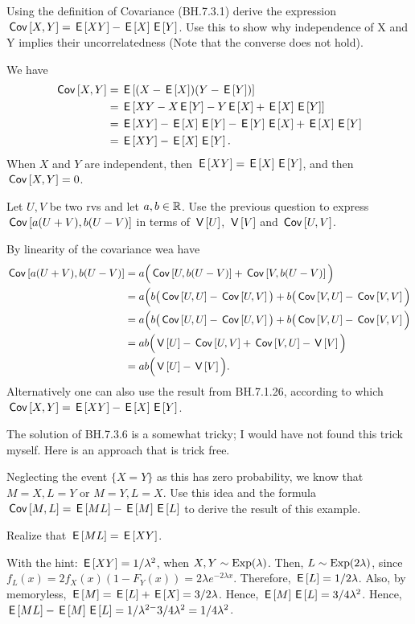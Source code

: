 \begin{exercise}
Using the definition of Covariance (BH.7.3.1) derive the expression $\cov{X,Y}=\E{XY}-\E{X}\E{Y}$. Use this to show why independence of X and Y implies their uncorrelatedness (Note that the converse does not hold).
\begin{solution}
We have
\begin{align}
    \cov{X,Y} &= \E{(X - \E{X})(Y - \E{Y})} \\
    &= \E{XY - X\E{Y} - Y\E{X} + \E{X}\E{Y}} \\
    &= \E{XY} - \E{X}\E{Y} - \E{Y} \E{X} + \E{X}\E{Y}\\
    &= \E{XY}-\E{X}\E{Y}.
\end{align}
When $X$ and $Y$ are independent, then $\E{XY} = \E X \E Y$, and then $\cov{X,Y}=0$.
\end{solution}
\end{exercise}

\begin{exercise}
Let $U, V$ be two rvs and let $a,b\in \R$.
Use the previous question to express $\cov{a(U+V), b(U-V)}$ in terms of $\V{U}$, $\V{V}$ and $\cov{U,V}$.
\begin{solution}
By linearity of the covariance wea have
\begin{align}
    \cov{a(U+V), b(U-V)} &= a \Big( \cov{U, b(U-V)} + \cov{V, b(U-V)} \Big) \\
    &= a \Big( b\big( \cov{U, U} - \cov{U, V} \big)  + b\big( \cov{V, U} - \cov{V,V} \Big) \\
    &= a \Big( b\big( \cov{U, U} - \cov{U, V} \big)  + b\big( \cov{V, U} - \cov{V,V} \Big) \\
    &= a b \Big( \V{U} - \cov{U, V} + \cov{V, U} - \V{V} \Big) \\
    &= a b \Big( \V{U} - \V{V} \Big).
\end{align}
Alternatively one can also use the result from BH.7.1.26, according to which $\cov{X,Y} = \E{XY}-\E{X}\E{Y}$.
\end{solution}
\end{exercise}


\begin{exercise}\label{ex:3a}
The solution of BH.7.3.6 is a somewhat tricky; I would have not  found this trick myself. Here is an approach that is trick free.

Neglecting the event $\{X=Y\}$ as this has zero probability, we know that $M=X, L=Y$ or $M=Y, L=X$. Use this idea and the formula $\cov{M,L} = \E{ML} - \E M \E L$ to derive the result of this example.
\begin{hint}
Realize that $\E{ML} = \E{XY}$.
\end{hint}
\begin{solution}
With the hint: $\E{XY}=1/\lambda^{2}$, when $X, Y \sim\Exp{\lambda}$. Then, $L\sim \Exp{2\lambda}$, since $f_{L}(x) = 2 f_X(x) (1-F_Y(x)) = 2 \lambda e^{-2\lambda x}$. Therefore, $\E L = 1/2\lambda$. Also, by memoryless, $\E{M} = \E L + \E X = 3/2\lambda$. Hence, $\E{M}\E L = 3/4\lambda^{2}$. Hence, $\E{ML}- \E M \E L = 1/\lambda^{2-} 3/4\lambda^2 = 1/4\lambda^{2}$.
\end{solution}
\end{exercise}



